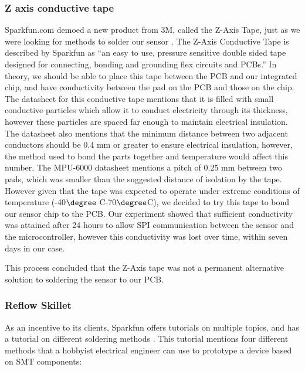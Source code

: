 \subsubsection{Z axis conductive tape}
\label{Sec:ZTape}
Sparkfun.com demoed a new product from 3M,
called the Z-Axis Tape,
just as we were looking for methods to solder our sensor \cite{Web:SFETAPEV}.
The Z-Axis Conductive Tape is described by Sparkfun as ``an easy to use,
pressure sensitive double sided tape designed for connecting,
bonding and grounding flex circuits and PCBs.''
In theory, we should be able to place this tape between the PCB and our integrated chip,
and have conductivity between the pad on the PCB and those on the chip.
The datasheet for this conductive tape mentions that it is filled with small conductive particles which allow it to conduct electricity through its thickness,
however these particles are spaced far enough to maintain electrical insulation.
The datasheet also mentions that the minimum distance between two adjacent conductors should be 0.4 mm or greater to ensure electrical insulation,
however, the method used to bond the parts together and temperature would affect this number.
The MPU-6000 datasheet mentions a pitch of 0.25 mm between two pads,
which was smaller than the suggested distance of isolation by the tape.
However given that the tape was expected to operate under extreme conditions of temperature (-40$\degree$ C-70$\degree$C),
we decided to try this tape to bond our sensor chip to the PCB.
Our experiment showed that sufficient conductivity was attained after 24 hours to allow SPI communication between the sensor and the microcontroller,
however this conductivity was lost over time,
within seven days in our case.

This process concluded that the Z-Axis tape was not a permanent alternative solution to soldering the sensor to our PCB.

\subsubsection{Reflow Skillet}
\label{Sec:ToasterReflow}
As an incentive to its clients,
Sparkfun offers tutorials on multiple topics,
and has a tutorial on different soldering methods \cite{Web:SparkfunSoldering}.
This tutorial mentions four different methods that a hobbyist electrical engineer can use to prototype a device based on SMT components:

